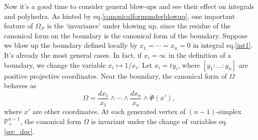 \documentclass[12pt]{article}
\theoremstyle{definition}
\theoremstyle{plain}
\newcommand{\dif}{\mathrm{d}} %
\begin{document}
Now it's a good time to consider general blow-ups and see their effect on 
integrals and polyhedra. As hinted by eq.\eqref{canonicalformunderblowup}, 
one important feature of $\Omega_{\mathcal P}$ is the `invariance' under blowing up, 
since the residue of the canonical form on the boundary is
the canonical form of the boundary.
Suppose we blow up the boundary defined locally by $x_1=\cdots=x_n=0$ in integral eq.\eqref{int1}. 
It's already the most general cases. In fact, if $x_i=\infty$ in the definition 
of a boundary, we change the variable $x_i\mapsto 1/x_i$. Let $x_i=ty_i$, 
where $[y_1:\dots:y_n]$ are positive projective coordinates. 
Near the boundary, the canonical form of $\Omega$ behaves as 
\[
	\Omega=\frac{dx_1}{x_1}\wedge \cdots\wedge\frac{dx_n}{x_n}
	\wedge \Phi(x'),
\]
where $x'$ are other coordinates. 
At each generated vertex of $(n-1)$-simplex $\mathbb P_+^{n-1}$, the canonical
form $\Omega$ is invariant under the change of variables eq.\eqref{sec_doc}.



\end{document}
